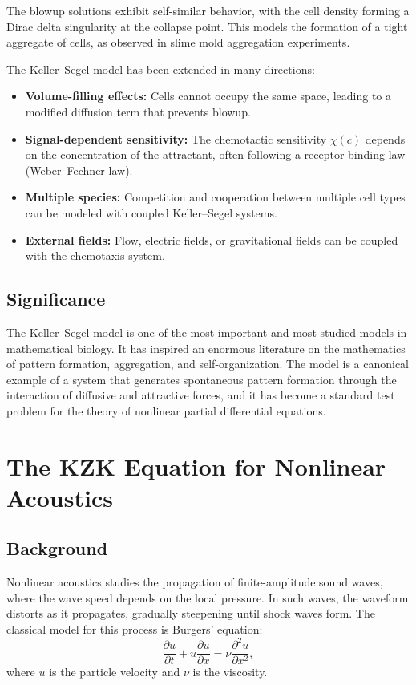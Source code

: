 The blowup solutions exhibit self-similar behavior, with the cell density forming a Dirac delta singularity at the collapse point. This models the formation of a tight aggregate of cells, as observed in slime mold aggregation experiments.

The Keller--Segel model has been extended in many directions:
\begin{itemize}
  \item \textbf{Volume-filling effects:} Cells cannot occupy the same space, leading to a modified diffusion term that prevents blowup.
  \item \textbf{Signal-dependent sensitivity:} The chemotactic sensitivity \(\chi(c)\) depends on the concentration of the attractant, often following a receptor-binding law (Weber--Fechner law).
  \item \textbf{Multiple species:} Competition and cooperation between multiple cell types can be modeled with coupled Keller--Segel systems.
  \item \textbf{External fields:} Flow, electric fields, or gravitational fields can be coupled with the chemotaxis system.
\end{itemize}

\subsection{Significance}

The Keller--Segel model is one of the most important and most studied models in mathematical biology. It has inspired an enormous literature on the mathematics of pattern formation, aggregation, and self-organization. The model is a canonical example of a system that generates spontaneous pattern formation through the interaction of diffusive and attractive forces, and it has become a standard test problem for the theory of nonlinear partial differential equations.

\section{The KZK Equation for Nonlinear Acoustics}

\subsection{Background}

Nonlinear acoustics studies the propagation of finite-amplitude sound waves, where the wave speed depends on the local pressure. In such waves, the waveform distorts as it propagates, gradually steepening until shock waves form. The classical model for this process is Burgers' equation:
\[
\frac{\partial u}{\partial t} + u\frac{\partial u}{\partial x} = \nu \frac{\partial^2 u}{\partial x^2},
\]
where \(u\) is the particle velocity and \(\nu\) is the viscosity.

